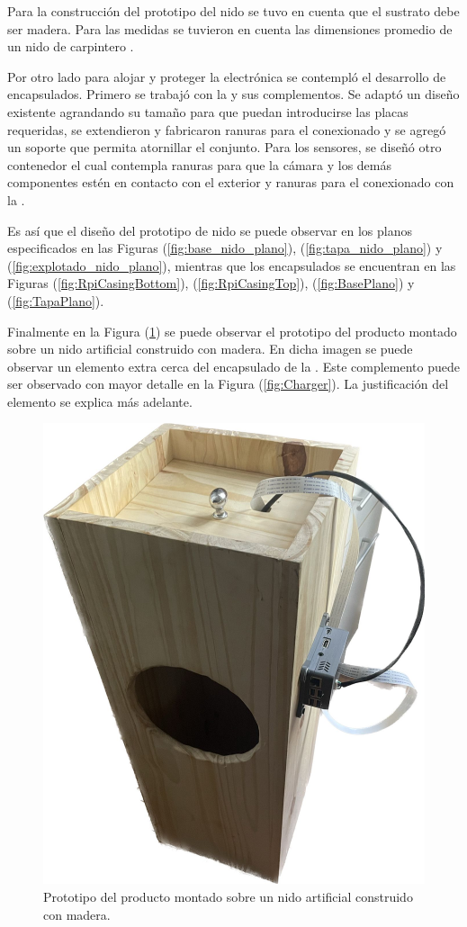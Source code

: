 \label{subsection:nido-sustrato}
Para la construcción del prototipo del nido se tuvo en cuenta que el sustrato debe ser madera. Para las medidas se tuvieron en cuenta las dimensiones promedio de un nido de carpintero \cite{ref:PaperValeriaOjeda}.

Por otro lado para alojar y proteger la electrónica se contempló el desarrollo de encapsulados. Primero se trabajó con la \rspi y sus complementos. Se adaptó un diseño existente agrandando su tamaño para que puedan introducirse las placas requeridas, se extendieron y fabricaron ranuras para el conexionado y se agregó un soporte que permita atornillar el conjunto. Para los sensores, se diseñó otro contenedor el cual contempla ranuras para que la cámara y los demás componentes estén en contacto con el exterior y ranuras para el conexionado con la \rpi.

Es así que el diseño del prototipo de nido se puede observar en los planos especificados en las Figuras (\ref{fig:base_nido_plano}), (\ref{fig:tapa_nido_plano}) y (\ref{fig:explotado_nido_plano}), mientras que los encapsulados se encuentran en las Figuras (\ref{fig:RpiCasingBottom}), (\ref{fig:RpiCasingTop}), (\ref{fig:BasePlano}) y (\ref{fig:TapaPlano}).

Finalmente en la Figura (\ref{fig:caja_prototipo}) se puede observar el prototipo del producto montado sobre un nido artificial construido con madera. En dicha imagen se puede observar un elemento extra cerca del encapsulado de la \rspi. Este complemento puede ser observado con mayor detalle en la Figura (\ref{fig:Charger}). La justificación del elemento se explica más adelante.

\begin{figure}[H]
	\centering	\includegraphics[width=0.6\linewidth,page=1]{ImagenesConstruccion del prototipo/caja_prototipo}		
	\caption{Prototipo del producto montado sobre un nido artificial construido con madera.}
	\label{fig:caja_prototipo}
\end{figure}

